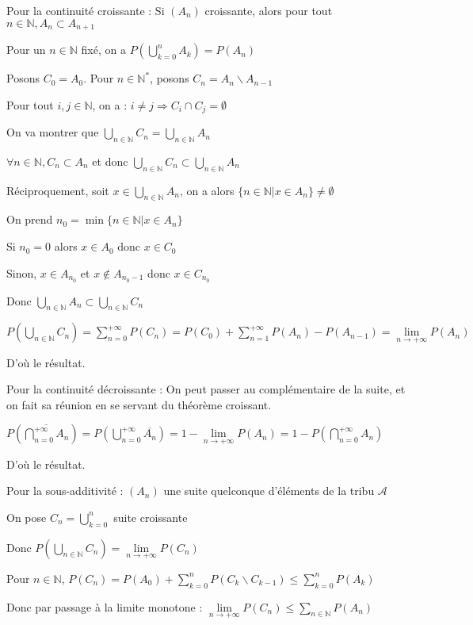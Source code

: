 \documentclass[a4paper,12pt]{book}
\newcommand{\Pre}[1]{\begin{tcolorbox}[sharp corners, colback=white,colframe=green!60!green!30!black!75, title=Preuve]#1\end{tcolorbox}}
\def\N{\mathbb{N}}
\begin{document}
\Pre{Pour la continuité croissante : Si $(A_n)$ croissante, alors pour tout $n\in\N, A_n\subset A_{n+1}$
\par Pour un $n\in\N$ fixé, on a $P\left(\bigcup_{k=0}^nA_k\right)=P(A_n)$
\par Posons $C_0=A_0$. Pour $n\in\N^*$, posons $C_n=A_n\backslash A_{n-1}$
\par Pour tout $i,j\in\N$, on a : $i\neq j\Rightarrow C_i\cap C_j=\emptyset$
\par On va montrer que $\bigcup_{n\in\N}C_n =\bigcup_{n\in\N}A_n$
\par $\forall n\in\N, C_n\subset A_n$ et donc $\bigcup_{n\in\N}C_n\subset \bigcup_{n\in\N}A_n$
\par Réciproquement, soit $x\in\bigcup_{n\in\N}A_n$, on a alors $\{n\in\N\vert x\in A_n\}\neq\emptyset$
\par On prend $n_0 = \min\{n\in\N\vert x\in A_n\}$
\par Si $n_0=0$ alors $x\in A_0$ donc $x\in C_0$
\par Sinon, $x\in A_{n_0}$ et $x\notin A_{n_0-1}$ donc $x\in C_{n_0}$
\par Donc $\bigcup_{n\in\N}A_n\subset \bigcup_{n\in\N}C_n$
\par $P\left(\bigcup_{n\in\N}C_n\right) =\sum\limits_{n=0}^{+\infty}P(C_n) = P(C_0)+\sum\limits_{n=1}^{+\infty}P(A_n)-P(A_{n-1})=\lim\limits_{n\to+\infty}P(A_n)$
\par D'où le résultat.
\par Pour la continuité décroissante : On peut passer au complémentaire de la suite, et on fait sa réunion en se servant du théorème croissant.
\par $P\left(\overline{\bigcap_{n=0}^{+\infty}A_n}\right)= P\left(\bigcup_{n=0}^{+\infty}\overline{A_n}\right) =1-\lim\limits_{n\to+\infty}P(A_n) = 1-P\left(\bigcap_{n=0}^{+\infty}A_n\right)$
\par D'où le résultat.
\par Pour la sous-additivité : $(A_n)$ une suite quelconque d'éléments de la tribu $\mathcal{A}$
\par On pose $C_n=\bigcup_{k=0}^n$ suite croissante
\par Donc $P\left(\bigcup_{n\in\N}C_n\right) =\lim\limits_{n\to+\infty}P(C_n)$
\par Pour $n\in\N$, $P(C_n)=P(A_0)+\sum\limits_{k=0}^nP(C_k\backslash C_{k-1})\leq \sum\limits_{k=0}^nP(A_k)$
\par Donc par passage à la limite monotone : $\lim\limits_{n\to+\infty}P(C_n)\leq \sum\limits_{n\in\N}P(A_n)$}
\end{document}
